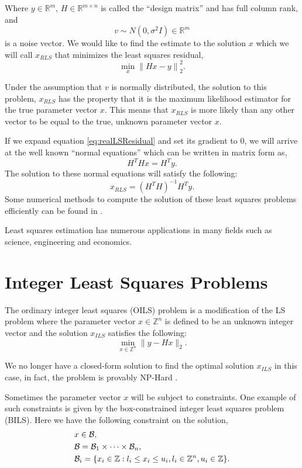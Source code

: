 \documentclass[12pt,Bold,letterpaper]{mcgilletdclass}
\newcommand{\be}{\begin{equation}}
\newcommand{\ee}{\end{equation}}
\newcommand{\boxcon}{{\cal B}}
\newcommand{\vsp}{\vspace{\baselineskip}}
\begin{document}
Where $y\in\mathbb{R}^m$, $H\in\mathbb{R}^{m \times n}$ is called the
``design matrix'' and has full column rank, and $$v \sim N(0,\sigma^2I) \in\mathbb{R}^m$$ is a
noise vector. We would like to find the estimate to the solution $x$ which we will call
$x_{\scriptscriptstyle{RLS}}$ that minimizes the least squares residual,
\be
\label{eq:realLSResidual}
	\min_x \left \| Hx - y \right \|^2_2.
\ee

Under the assumption that $v$ is normally distributed, the solution to this problem, $x_{\scriptscriptstyle{RLS}}$ has the property that it is the maximum likelihood estimator for the true parameter vector $x$. This means that $x_{\scriptscriptstyle{RLS}}$ is more likely than any other vector to be equal to the true, unknown parameter vector $x$. 

If we expand equation \eqref{eq:realLSResidual} and set its gradient to $0$, we will arrive at the
well known ``normal equations'' which can be written in matrix form as,
\begin{equation}
H^THx = H^Ty.
\label{eq:normalEquations}
\end{equation}
The solution to these normal equations will satisfy the following:
$$x_{\scriptscriptstyle{RLS}} = (H^TH)^{-1}H^Ty.$$
Some numerical methods to compute the solution of these least squares problems efficiently can be found in \cite{Bjo96}.

Least squares estimation has numerous applications in many fields such as science, engineering and economics.

\vsp \section{Integer Least Squares Problems}
The ordinary integer least squares (OILS) problem is a modification of the LS problem
where the parameter vector $x\in\mathbb{Z}^n$ is defined to be an unknown integer vector and the solution $x_{\scriptscriptstyle{ILS}}$ satisfies the following: 
\be
\label{eq:ils0}
\min_{x \in {\mathbb{Z}}^n}  \| y- Hx \|_2. 
\ee

We no longer have a closed-form solution to find the optimal solution $x_{\scriptscriptstyle{ILS}}$ in this case, in fact, the
problem is provably NP-Hard \cite{Mic01}.  

Sometimes the parameter vector $x$ will be subject to constraints. One example of such constraints is given by the box-constrained integer least squares
problem (BILS). Here we have the following constraint on the solution, 
\begin{align} \label{eq:boxCon}
&x\in \boxcon,\\
&{\cal B} = {\cal B}_1  \times \cdots \times {\cal B}_n,\\
&\boxcon_i = \{x_i\in\mathbb{Z} : l_i\le x_i \le u_i, l_i\in \mathbb{Z}^n,
u_i\in\mathbb{Z} \}.
\end{align}
\end{document}
